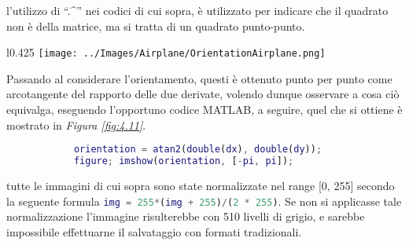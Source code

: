 \documentclass{subfiles}
\begin{document}
\begin{Note*}
    l'utilizzo di ``.\textasciicircum '' nei codici di cui sopra, è utilizzato per indicare che il quadrato non è della matrice, ma si tratta di un quadrato punto-punto.
\end{Note*}
\begin{wrapfigure}{l}{0.425\textwidth}
    \centering
    \texttt{[image: ../Images/Airplane/OrientationAirplane.png]}
    \caption{\emph{Figura \ref{fig:4.9}} da un punto di vista dell'orientamento dei moduli del gradiente.}
    \label{fig:4.11}
\end{wrapfigure}
Passando al considerare l'orientamento, questi è ottenuto punto per punto come arcotangente del rapporto delle due derivate,
volendo dunque osservare a cosa ciò equivalga, eseguendo l'opportuno codice MATLAB, a seguire, quel che si ottiene è mostrato in \emph{Figura \ref{fig:4.11}}.
\begin{center}
    \begin{lstlisting}[language = MATLAB]
            % dx e dy sono le immagine sin ora calcolate
            orientation = atan2(double(dx), double(dy));
            figure; imshow(orientation, [-pi, pi]);
        \end{lstlisting}
\end{center}

\begin{Note*}
    tutte le immagini di cui sopra sono state normalizzate nel range [0, 255] secondo la seguente formula \lstinline[language = MATLAB]{img = 255*(img + 255)/(2 * 255)}.
    Se non si applicasse tale normalizzazione l'immagine risulterebbe con 510 livelli di grigio, e sarebbe impossibile effettuarne il salvataggio con formati tradizionali.
\end{Note*}
\end{document}
